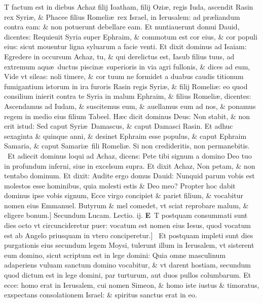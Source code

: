 \documentclass[a5paper,10pt]{book}
\def\ae{æ}
\begin{document}
\begin{multicols*}{2}
\vspace{-.5em}
T factum est in diebus Achaz filij Ioatham, filij Ozi\ae , regis Iuda, ascendit Rasin rex Syri\ae , \& Phacee filius Romeli\ae \ rex Israel, in Ierusalem: ad pr\ae liandum contra eam: \& non potuerunt debellare eam.
Et nuntiauerunt domui Dauid, dicentes: Requieuit Syria super Ephraim, \& commotum est cor eius, \& cor populi eius: sicut mouentur ligna syluarum a facie venti.
Et dixit dominus ad Isaiam: Egredere in occursum Achaz, tu, \& qui derelictus est, Iasub filius tuus, ad extremum aqu\ae \ ductus piscin\ae \ superioris in via agri fullonis, \& dices ad eum, Vide vt sileas: noli timere, \& cor tuum ne formidet a duabus caudis titionum fumigantium istorum in ira furoris Rasin regis Syri\ae , \& filij Romeli\ae : eo quod consilium inierit contra te Syria in malum Ephraim, \& filius Romeli\ae , dicentes: Ascendamus ad Iudam, \& suscitemus eum, \& auellamus eum ad nos, \& ponamus regem in medio eius filium Tabeel.
H\ae c dicit dominus Deus: Non stabit, \& non erit istud:
Sed caput Syri\ae \ Damascus, \& caput Damasci Rasin.
Et adhuc sexaginta \& quinque anni, \& desinet Ephraim esse populus, \& caput Ephraim Samaria, \& caput Samari\ae \ fili Romeli\ae .
Si non credideritis, non permanebitis. \textdagger \ 
Et adiecit dominus loqui ad Achaz, dicens: Pete tibi signum a domino Deo tuo in profundum inferni, siue in excelsum supra. Et dixit Achaz, Non petam, \& non tentabo dominum.
Et dixit: Audite ergo domus Dauid: Nunquid parum vobis est molestos esse hominibus, quia molesti estis \& Deo meo?
Propter hoc dabit dominus ipse vobis signum, Ecce virgo concipiet \& pariet filium, \& vocabitur nomen eius Emmanuel.
Butyrum \& mel comedet, vt sciat reprobare malum, \& eligere bonum.]
\newline \color{red} Secundum Lucam. \hfill Lectio. ij. \color{black}
\vspace{-.25em}
\lettrine[lines=2]{\bfseries \color{red} E}{}\textdagger \ T postquam consummati sunt dies octo vt circuncideretur puer: vocatum est nomen eius Iesus, quod vocatum est ab Angelo priusquam in vtero conciperetur.] \textdagger \ 
Et postquam impleti sunt dies purgationis eius secundum legem Moysi, tulerunt illum in Ierusalem, vt sisterent eum domino, sicut scriptum est in lege domini: Quia omne masculinum adaperiens vuluam sanctum domino vocabitur, \& vt darent hostiam, secundum quod dictum est in lege domini, par turturum, aut duos pullos columbarum.
Et ecce: homo erat in Ierusalem, cui nomen Simeon, \& homo iste iustus \& timoratus, exspectans consolationem Israel: \& spiritus sanctus erat in eo.

\end{multicols*}
\end{document}
